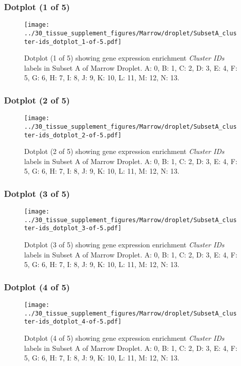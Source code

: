 \clearpage

\subsubsection{Dotplot (1 of 5)}
\begin{figure}[h]
\centering
\texttt{[image: ../30\_tissue\_supplement\_figures/Marrow/droplet/SubsetA\_cluster-ids\_dotplot\_1-of-5.pdf]}

\caption{ Dotplot (1 of 5)  showing gene expression enrichment \emph{Cluster IDs} labels in Subset A of Marrow Droplet. A: 0, B: 1, C: 2, D: 3, E: 4, F: 5, G: 6, H: 7, I: 8, J: 9, K: 10, L: 11, M: 12, N: 13.}
\end{figure}


\clearpage

\subsubsection{Dotplot (2 of 5)}
\begin{figure}[h]
\centering
\texttt{[image: ../30\_tissue\_supplement\_figures/Marrow/droplet/SubsetA\_cluster-ids\_dotplot\_2-of-5.pdf]}

\caption{ Dotplot (2 of 5)  showing gene expression enrichment \emph{Cluster IDs} labels in Subset A of Marrow Droplet. A: 0, B: 1, C: 2, D: 3, E: 4, F: 5, G: 6, H: 7, I: 8, J: 9, K: 10, L: 11, M: 12, N: 13.}
\end{figure}


\clearpage

\subsubsection{Dotplot (3 of 5)}
\begin{figure}[h]
\centering
\texttt{[image: ../30\_tissue\_supplement\_figures/Marrow/droplet/SubsetA\_cluster-ids\_dotplot\_3-of-5.pdf]}

\caption{ Dotplot (3 of 5)  showing gene expression enrichment \emph{Cluster IDs} labels in Subset A of Marrow Droplet. A: 0, B: 1, C: 2, D: 3, E: 4, F: 5, G: 6, H: 7, I: 8, J: 9, K: 10, L: 11, M: 12, N: 13.}
\end{figure}


\clearpage

\subsubsection{Dotplot (4 of 5)}
\begin{figure}[h]
\centering
\texttt{[image: ../30\_tissue\_supplement\_figures/Marrow/droplet/SubsetA\_cluster-ids\_dotplot\_4-of-5.pdf]}

\caption{ Dotplot (4 of 5)  showing gene expression enrichment \emph{Cluster IDs} labels in Subset A of Marrow Droplet. A: 0, B: 1, C: 2, D: 3, E: 4, F: 5, G: 6, H: 7, I: 8, J: 9, K: 10, L: 11, M: 12, N: 13.}
\end{figure}


